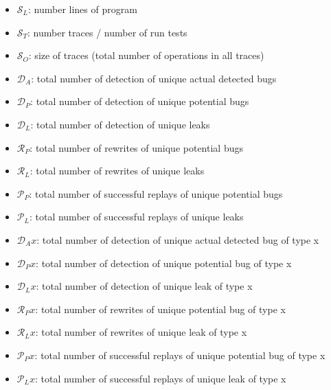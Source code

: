 \documentclass{article}
\begin{document}
\begin{itemize}
\item $\mathcal{S}_L$: number lines of program
\item $\mathcal{S}_T$: number traces / number of run tests
\item $\mathcal{S}_O$: size of traces (total number of operations in all traces)
\item $\mathcal{D}_A$: total number of detection of unique actual detected bugs
\item $\mathcal{D}_P$: total number of detection of unique potential bugs
\item $\mathcal{D}_L$: total number of detection of unique leaks
\item $\mathcal{R}_P$: total number of rewrites of  unique potential bugs
\item $\mathcal{R}_L$: total number of rewrites of  unique leaks
\item $\mathcal{P}_P$: total number of successful replays of unique potential bugs
\item $\mathcal{P}_L$: total number of successful replays of unique leaks
\item $\mathcal{D}_Ax$: total number of detection of unique actual detected bug of type x
\item $\mathcal{D}_Px$: total number of detection of unique potential bug of type x
\item $\mathcal{D}_Lx$: total number of detection of unique leak of type x
\item $\mathcal{R}_Px$: total number of rewrites of  unique potential bug of type x
\item $\mathcal{R}_Lx$: total number of rewrites of  unique leak of type x
\item $\mathcal{P}_Px$: total number of successful replays of unique potential bug of type x
\item $\mathcal{P}_Lx$: total number of successful replays of unique leak of type x
\end{itemize}
\end{document}
